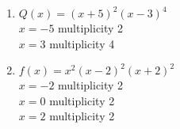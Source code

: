 \documentclass{ximera}
\begin{document}
\begin{multicols}{2}
\begin{enumerate}
\setcounter{enumi}{\value{HW}}


\item $Q(x) = (x + 5)^{2}(x - 3)^{4}$\\
$x = -5$ multiplicity 2\\
$x = 3$ multiplicity 4\\


\vfill

\columnbreak

\item $f(x) = x^2(x-2)^2(x+2)^2$\\
$x = -2$ multiplicity 2\\
$x = 0$ multiplicity 2\\
$x = 2$ multiplicity 2\\


\setcounter{HW}{\value{enumi}}
\end{enumerate}
\end{multicols}
\end{document}
